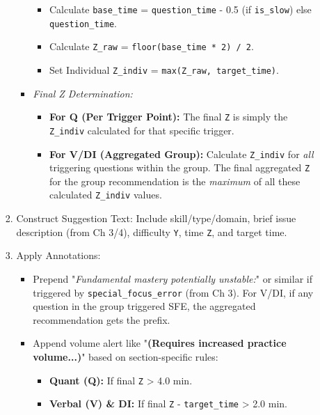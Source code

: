 \documentclass{article}
\begin{document}
\begin{enumerate}
\begin{itemize}
\begin{enumerate}
\begin{itemize}
\begin{itemize}
                                \item Calculate \texttt{base\_time} = \texttt{question\_time} - 0.5 (if \texttt{is\_slow}) else \texttt{question\_time}.
                                \item Calculate \texttt{Z\_raw} = \texttt{floor(base\_time * 2) / 2}.
                                \item Set Individual \texttt{Z\_indiv} = \texttt{max(Z\_raw, target\_time)}.
                            \end{itemize}
                        \item \textit{Final Z Determination:}
                            \begin{itemize}
                                \item \textbf{For Q (Per Trigger Point):} The final \texttt{Z} is simply the \texttt{Z\_indiv} calculated for that specific trigger.
                                \item \textbf{For V/DI (Aggregated Group):} Calculate \texttt{Z\_indiv} for \textit{all} triggering questions within the group. The final aggregated \texttt{Z} for the group recommendation is the \textit{maximum} of all these calculated \texttt{Z\_indiv} values.
                            \end{itemize}
                    \end{itemize}
                \item Construct Suggestion Text: Include skill/type/domain, brief issue description (from Ch 3/4), difficulty \texttt{Y}, time \texttt{Z}, and target time.
                \item Apply Annotations:
                    \begin{itemize}
                        \item Prepend "\textit{Fundamental mastery potentially unstable:}" or similar if triggered by \texttt{special\_focus\_error} (from Ch 3). For V/DI, if any question in the group triggered SFE, the aggregated recommendation gets the prefix.
                        \item Append volume alert like "\textbf{(Requires increased practice volume...)}" based on section-specific rules:
                            \begin{itemize}
                                \item \textbf{Quant (Q):} If final \texttt{Z} > 4.0 min.
                                \item \textbf{Verbal (V) & DI:} If final \texttt{Z} - \texttt{target\_time} > 2.0 min.

\end{itemize}
\end{itemize}
\end{enumerate}
\end{itemize}
\end{enumerate}
\end{document}
